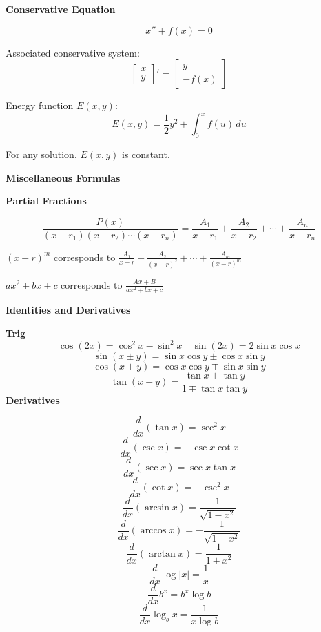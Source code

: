 \documentclass[10pt]{article}
\newcommand{\vvec}[2]{\begin{bmatrix}#1 \\ #2 \end{bmatrix}}
\newcommand\sectionheading[1]{\begin{center}\large{\textbf{#1}}\end{center}\normalsize}
\newcommand\heading[1]{\smallskip\textbf{#1}\smallskip}
\begin{document}
\begin{multicols*}{3}
\heading{Conservative Equation}

\[x''+f(x)=0\]

Associated conservative system:
\[\vvec{x}{y}'=\vvec{y}{-f(x)}\]

Energy function $E(x,y)$:
\[E(x,y)=\frac 12y^2+\int_0^x f(u)\,du\]

For any solution, $E(x,y)$ is constant.

\sectionheading{Miscellaneous Formulas}

\heading{Partial Fractions}

{\footnotesize
\[\frac{P(x)}{(x-r_1)(x-r_2)\cdots(x-r_n)}=\frac{A_1}{x-r_1}+\frac{A_2}{x-r_2}+\cdots+\frac{A_n}{x-r_n}\]}

$(x-r)^m$ corresponds to $\displaystyle\frac{A_1}{x-r}+\frac{A_2}{(x-r)^2}+\cdots+\frac{A_m}{(x-r)^m}$

$ax^2+bx+c$ corresponds to $\frac{Ax+B}{ax^2+bx+c}$

\sectionheading{Identities and Derivatives}
\heading{Trig}
\[\cos(2x)=\cos^2 x-\sin^2 x \quad \sin(2x)=2\sin x\cos x\]
\[\sin(x\pm y)=\sin x \cos y \pm \cos x \sin y\]
\[\cos(x\pm y)=\cos x \cos y \mp \sin x \sin y\]
\[\tan(x\pm y)=\frac{\tan x \pm \tan y}{1 \mp \tan x \tan y}\]
\heading{Derivatives} 
\begin{multicols*}{2}
\[\frac{d}{dx} (\tan x)=\sec^2 x\]
\[\frac{d}{dx} (\csc x)=-\csc x \cot x\]
\[\frac{d}{dx} (\sec x)=\sec x \tan x\]
\[\frac{d}{dx} (\cot x)=-\csc^2 x\]
\[\frac{d}{dx} (\arcsin x)=\frac{1}{\sqrt{1-x^2}}\]
\[\frac{d}{dx} (\arccos x)=-\frac{1}{\sqrt{1-x^2}}\]
\[\frac{d}{dx} (\arctan x)=\frac{1}{1+x^2}\]
\[\frac{d}{dx} \log |x| = \frac{1}{x}\]
\[\frac{d}{dx} b^x = b^x \log b\]
\[\frac{d}{dx} \log_b x=\frac{1}{x\log b}\]
\end{multicols*}

\end{multicols*}
\end{document}
